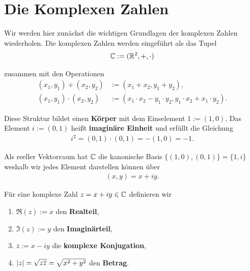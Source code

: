 \section{Die Komplexen Zahlen}
\label{\detokenize{complexanalysis/complexnumbers:die-komplexen-zahlen}}\label{\detokenize{complexanalysis/complexnumbers::doc}}
\par
Wir werden hier zunächst die wichtigen Grundlagen der komplexen Zahlen wiederholen.
Die komplexen Zahlen werden eingeführt als das Tupel
\begin{align*}
\mathbb{C} := (\mathbb{R}^2,+,\cdot)
\end{align*}
\par
zusammen mit den Operationen
\begin{align*}
(x_1,y_1) + (x_2,y_2) &:= (x_1 + x_2, y_1+y_2),\\
(x_1,y_1) \cdot (x_2,y_2) &:= (x_1\cdot x_2 - y_1\cdot y_2, y_1\cdot x_2 + x_1\cdot y_2).
\end{align*}
\par
Diese Struktur bildet einen \textbf{Körper} mit dem Einselement \(1:=(1,0)\). Das Element \(i:=(0,1)\) heißt \textbf{imaginäre Einheit} und erfüllt die Gleichung
\begin{align*}
i^2 = (0,1)\cdot(0,1) = -(1,0) = -1.
\end{align*}
\par
Als reeller Vektorraum hat \(\mathbb{C}\) die kanonische Basis \(\{(1,0),(0,1)\}=\{1,i\}\) weshalb wir jedes Element darstellen können über
\begin{align*}
(x,y) = x + iy.
\end{align*}
\par
Für eine komplexe Zahl \(z=x+ iy\in\mathbb{C}\) definieren wir
\begin{enumerate}

\item {} 
\par
\(\Re(z):= x\) den \textbf{Realteil},

\item {} 
\par
\(\Im(z):=y\) den \textbf{Imaginärteil},

\item {} 
\par
\(\overline{z}:= x-iy\) die \textbf{komplexe Konjugation},

\item {} 
\par
\(\vert z \vert = \sqrt{z\overline{z}} = \sqrt{x^2+y^2}\) den \textbf{Betrag}.

\end{enumerate}

